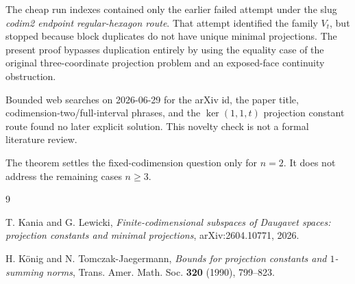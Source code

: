 \documentclass[11pt]{article}
\begin{document}
The cheap run indexes contained only the earlier failed attempt under the slug
\emph{codim2 endpoint regular-hexagon route}.  That attempt identified the
family \(V_t\), but stopped because block duplicates do not have unique minimal
projections.  The present proof bypasses duplication entirely by using the
equality case of the original three-coordinate projection problem and an
exposed-face continuity obstruction.

Bounded web searches on 2026-06-29 for the arXiv id, the paper title,
codimension-two/full-interval phrases, and the \(\ker(1,1,t)\) projection
constant route found no later explicit solution.  This novelty check is not a
formal literature review.

The theorem settles the fixed-codimension question only for \(n=2\).  It does
not address the remaining cases \(n\geq 3\).

\begin{thebibliography}{9}

T. Kania and G. Lewicki,
\emph{Finite-codimensional subspaces of Daugavet spaces: projection constants
and minimal projections},
arXiv:2604.10771, 2026.

H. K\"onig and N. Tomczak-Jaegermann,
\emph{Bounds for projection constants and \(1\)-summing norms},
Trans. Amer. Math. Soc. \textbf{320} (1990), 799--823.

\end{thebibliography}
\end{document}
